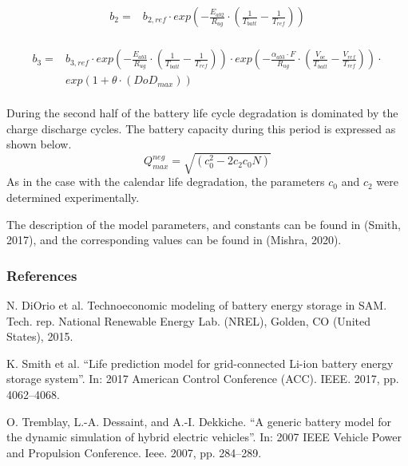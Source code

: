 \begin{equation}
\begin{split}
    b_2 = & b_{2,ref} \cdot exp\left(-\frac{E_{ab2}}{R_{ug}} \cdot \left(\frac{1}{T_{batt}} - \frac{1}{T_{ref}}\right) \right) \\
\end{split}
\label{Equation: b2_computation}
\end{equation}

\begin{equation}
\begin{split}
    b_3 = & b_{3,ref} \cdot exp\left(-\frac{E_{ab3}}{R_{ug}} \cdot \left(\frac{1}{T_{batt}} - \frac{1}{T_{ref}}\right) \right) \cdot
exp\left(-\frac{\alpha_{ab3}\cdot F}{R_{ug}} \cdot \left(\frac{V_{oc}}{T_{batt}} - \frac{V_{ref}}{T_{ref}}\right) \right) \cdot  \\
& exp\left(1 + \theta \cdot (DoD_{max})\right) \\
\end{split}
\label{Equation: b3_computation}
\end{equation}

During the second half of the battery life cycle degradation is dominated by the charge discharge cycles. The battery capacity during this period is expressed as shown below.  
\begin{equation}
Q_{max}^{neg}=\sqrt{(c_0^2-2c_2 c_0 N)}                             
\label{Equation: qmax_computation_a}
\end{equation}
As in the case with the calendar life degradation, the parameters $c_0$ and $c_2$ were determined experimentally. 

The description of the model parameters, and constants can be found in (Smith, 2017), and the corresponding values can be found in (Mishra, 2020).

\subsubsection{References}\label{references-022-b}

N. DiOrio et al. Technoeconomic modeling of battery energy storage in SAM. Tech. rep. National Renewable Energy Lab. (NREL), Golden, CO (United States), 2015.

\noindent
K.  Smith  et  al.  “Life  prediction  model  for  grid-connected  Li-ion  battery energy  storage  system”.  In: 2017 American Control Conference (ACC). IEEE. 2017, pp. 4062–4068.

\noindent
O. Tremblay, L.-A. Dessaint, and A.-I. Dekkiche. “A generic battery model for the dynamic simulation of hybrid electric vehicles”. In: 2007 IEEE Vehicle Power and Propulsion Conference. Ieee. 2007, pp. 284–289.


